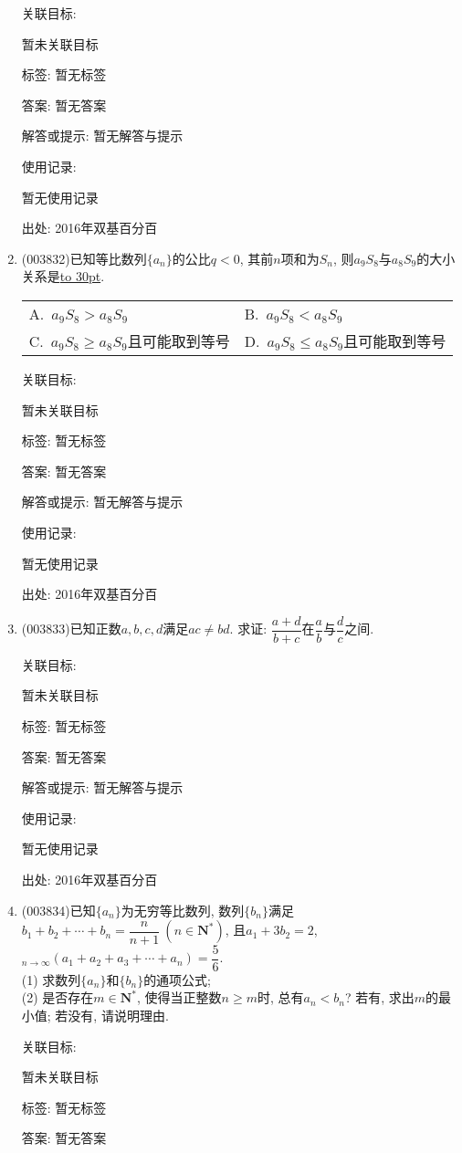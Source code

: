 \documentclass[10pt,a4paper]{article}
\newcommand{\blank}[1]{\underline{\hbox to #1pt{}}}
\newcommand{\twoch}[4]{\par\begin{tabular}{p{.46\textwidth}p{.46\textwidth}}
A.~#1& B.~#2\\
C.~#3& D.~#4
\end{tabular}}
\begin{document}
\begin{enumerate}[1.]
关联目标:

暂未关联目标



标签: 暂无标签

答案: 暂无答案

解答或提示: 暂无解答与提示

使用记录:

暂无使用记录


出处: 2016年双基百分百
\item { (003832)}已知等比数列$\{a_n\}$的公比$q<0$, 其前$n$项和为$S_n$, 则$a_9S_8$与$a_8S_9$的大小关系是\blank{30}.
\twoch{$a_9S_8>a_8S_9$}{$a_9S_8<a_8S_9$}{$a_9S_8\ge a_8S_9$且可能取到等号}{$a_9S_8\le a_8S_9$且可能取到等号}


关联目标:

暂未关联目标



标签: 暂无标签

答案: 暂无答案

解答或提示: 暂无解答与提示

使用记录:

暂无使用记录


出处: 2016年双基百分百
\item { (003833)}已知正数$a,b,c,d$满足$ac\ne bd$. 求证: $\dfrac{a+d}{b+c}$在$\dfrac ab$与$\dfrac dc$之间.


关联目标:

暂未关联目标



标签: 暂无标签

答案: 暂无答案

解答或提示: 暂无解答与提示

使用记录:

暂无使用记录


出处: 2016年双基百分百
\item { (003834)}已知$\{a_n\}$为无穷等比数列, 数列$\{b_n\}$满足$b_1+b_2+\cdots+b_n=\dfrac{n}{n+1} \ (n\in \mathbf{N}^*)$, 且$a_1+3b_2=2$, $\displaystyle_{n\to \infty}(a_1+a_2+a_3+\cdots+a_n)=\dfrac 56$. \\
(1) 求数列$\{a_n\}$和$\{b_n\}$的通项公式;\\
(2) 是否存在$m\in \mathbf{N}^*$, 使得当正整数$n\ge m$时, 总有$a_n<b_n$? 若有, 求出$m$的最小值; 若没有, 请说明理由.


关联目标:

暂未关联目标



标签: 暂无标签

答案: 暂无答案


\end{enumerate}
\end{document}
